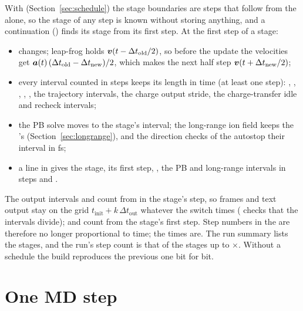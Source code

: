 With  (Section~\ref{sec:schedule}) the stage boundaries are steps that follow from the
 alone, so the stage of any step is known without storing anything, and a continuation ()
finds its stage from its first step.
At the first step of a stage:
\begin{itemize}
  \item {} changes; leap-frog holds $\bm{v}(t-\Delta t_{\mathrm{old}}/2)$, so before the update the velocities
    get $\bm{a}(t)\,(\Delta t_{\mathrm{old}}-\Delta t_{\mathrm{new}})/2$, which makes the next half step
    $\bm{v}(t+\Delta t_{\mathrm{new}}/2)$;
  \item every interval counted in steps keeps its length in time (at least one step): ,
    , , , , the trajectory intervals,
    the charge output stride, the charge-transfer idle and recheck intervals;
  \item the PB solve moves to the stage's interval; the long-range ion field keeps the 's
    (Section~\ref{sec:longrange}), and the direction checks of the autostop their interval in fs;
  \item a line in  gives the stage, its first step, , the PB and long-range intervals in steps and
    .
\end{itemize}
The output intervals and  count from  in the stage's step, so frames and text output
stay on the grid $t_{\mathrm{init}}+k\,\Delta t_{\mathrm{out}}$ whatever the switch times ( checks that the
intervals divide);  and  count from the stage's first step.
Step numbers in the  are therefore no longer proportional to time; the times are.
The run summary lists the stages, and the run's step count is that of the stages up to
$\times$.
Without a schedule the build reproduces the previous one bit for bit.

\section{One MD step}

